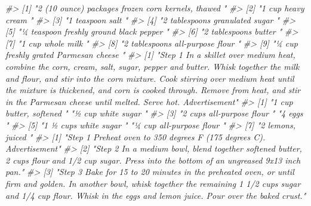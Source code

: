 \documentclass[
]{krantz}
\makeatletter
\newenvironment{Shaded}{\begin{snugshade}}{\end{snugshade}}
\newcommand{\CommentTok}[1]{\textcolor[rgb]{0.37,0.37,0.37}{\textit{#1}}}
\newenvironment{kframe}{%
\medskip{}
\setlength{\fboxsep}{.8em}
 \def\at@end@of@kframe{}%
 \ifinner\ifhmode%
  \def\at@end@of@kframe{\end{minipage}}%
  \begin{minipage}{\columnwidth}%
 \fi\fi%
 \def\FrameCommand##1{\hskip\@totalleftmargin \hskip-\fboxsep
 \colorbox{shadecolor}{##1}\hskip-\fboxsep
     \hskip-\linewidth \hskip-\@totalleftmargin \hskip\columnwidth}%
 \MakeFramed {\advance\hsize-\width
   \@totalleftmargin\z@ \linewidth\hsize
   \@setminipage}}%
 {\par\unskip\endMakeFramed%
 \at@end@of@kframe}
\renewenvironment{Shaded}{\begin{kframe}}{\end{kframe}}
\makeatother
\begin{document}
\begin{Shaded}
\begin{Highlighting}[]
\CommentTok{\#\textgreater{} [1] "2 (10 ounce) packages frozen corn kernels, thawed "}
\CommentTok{\#\textgreater{} [2] "1 cup heavy cream "                                }
\CommentTok{\#\textgreater{} [3] "1 teaspoon salt "                                  }
\CommentTok{\#\textgreater{} [4] "2 tablespoons granulated sugar "                   }
\CommentTok{\#\textgreater{} [5] "¼ teaspoon freshly ground black pepper "           }
\CommentTok{\#\textgreater{} [6] "2 tablespoons butter "                             }
\CommentTok{\#\textgreater{} [7] "1 cup whole milk "                                 }
\CommentTok{\#\textgreater{} [8] "2 tablespoons all{-}purpose flour "                  }
\CommentTok{\#\textgreater{} [9] "¼ cup freshly grated Parmesan cheese "             }
\CommentTok{\#\textgreater{} [1] "Step 1   In a skillet over medium heat, combine the corn, cream, salt, sugar, pepper and butter. Whisk together the milk and flour, and stir into the corn mixture. Cook stirring over medium heat until the mixture is thickened, and corn is cooked through. Remove from heat, and stir in the Parmesan cheese until melted. Serve hot.    Advertisement"}
\CommentTok{\#\textgreater{} [1] "1 cup butter, softened "   "½ cup white sugar "       }
\CommentTok{\#\textgreater{} [3] "2 cups all{-}purpose flour " "4 eggs "                  }
\CommentTok{\#\textgreater{} [5] "1 ½ cups white sugar "     "¼ cup all{-}purpose flour " }
\CommentTok{\#\textgreater{} [7] "2 lemons, juiced "        }
\CommentTok{\#\textgreater{} [1] "Step 1   Preheat oven to 350 degrees F (175 degrees C).    Advertisement"                                                                                                                                                                                                                                                                         }
\CommentTok{\#\textgreater{} [2] "Step 2   In a medium bowl, blend together softened butter, 2 cups flour and 1/2 cup sugar. Press into the bottom of an ungreased 9x13 inch pan."                                                                                                                                                                                                  }
\CommentTok{\#\textgreater{} [3] "Step 3   Bake for 15 to 20 minutes in the preheated oven, or until firm and golden. In another bowl, whisk together the remaining 1 1/2 cups sugar and 1/4 cup flour. Whisk in the eggs and lemon juice. Pour over the baked crust."                                                                                                              }

\end{Highlighting}
\end{Shaded}
\end{document}

